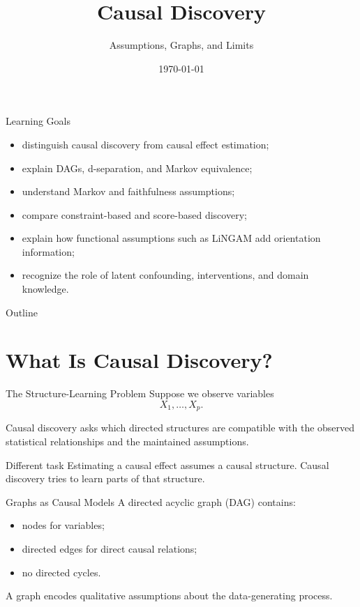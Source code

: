 \documentclass[aspectratio=169,11pt]{beamer}
\title[Causal Discovery]{Causal Discovery}
\subtitle{Assumptions, Graphs, and Limits}
\date{\today}
\begin{document}
\begin{frame}
\titlepage
\end{frame}

\begin{frame}{Learning Goals}
\begin{itemize}
\item distinguish causal discovery from causal effect estimation;
\item explain DAGs, d-separation, and Markov equivalence;
\item understand Markov and faithfulness assumptions;
\item compare constraint-based and score-based discovery;
\item explain how functional assumptions such as LiNGAM add orientation information;
\item recognize the role of latent confounding, interventions, and domain knowledge.
\end{itemize}
\end{frame}

\begin{frame}{Outline}
\tableofcontents
\end{frame}

\section{What Is Causal Discovery?}

\begin{frame}{The Structure-Learning Problem}
Suppose we observe variables
\[
X_1,\ldots,X_p.
\]

Causal discovery asks which directed structures are compatible with the observed statistical relationships and the maintained assumptions.

\begin{alertblock}{Different task}
Estimating a causal effect assumes a causal structure. Causal discovery tries to learn parts of that structure.
\end{alertblock}
\end{frame}

\begin{frame}{Graphs as Causal Models}
A directed acyclic graph (DAG) contains:
\begin{itemize}
\item nodes for variables;
\item directed edges for direct causal relations;
\item no directed cycles.
\end{itemize}

A graph encodes qualitative assumptions about the data-generating process.
\end{frame}
\end{document}
